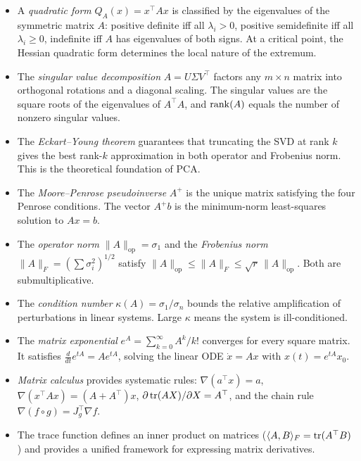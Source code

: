 \documentclass[11pt,a4paper]{article}
\begin{document}
\begin{itemize}
  \item A \emph{quadratic form} $Q_A(x) = x^\top Ax$ is classified
        by the eigenvalues of the symmetric matrix $A$: positive definite
        iff all $\lambda_i > 0$, positive semidefinite iff all
        $\lambda_i \geq 0$, indefinite iff $A$ has eigenvalues of
        both signs.  At a critical point, the Hessian quadratic form
        determines the local nature of the extremum.

  \item The \emph{singular value decomposition} $A = U\Sigma V^\top$
        factors any $m \times n$ matrix into orthogonal rotations and
        a diagonal scaling.  The singular values are the square roots
        of the eigenvalues of $A^\top A$, and $\operatorname{rank}(A)$ equals the
        number of nonzero singular values.

  \item The \emph{Eckart--Young theorem} guarantees that truncating the
        SVD at rank $k$ gives the best rank-$k$ approximation in both
        operator and Frobenius norm.  This is the theoretical
        foundation of PCA.

  \item The \emph{Moore--Penrose pseudoinverse} $A^+$ is the unique
        matrix satisfying the four Penrose conditions.  The vector
        $A^+ b$ is the minimum-norm least-squares solution to $Ax = b$.

  \item The \emph{operator norm} $\|A\|_{\mathrm{op}} = \sigma_1$ and
        the \emph{Frobenius norm} $\|A\|_F = (\sum \sigma_i^2)^{1/2}$
        satisfy $\|A\|_{\mathrm{op}} \leq \|A\|_F \leq \sqrt{r}\,\|A\|_{\mathrm{op}}$.
        Both are submultiplicative.

  \item The \emph{condition number} $\kappa(A) = \sigma_1/\sigma_n$
        bounds the relative amplification of perturbations in linear
        systems.  Large $\kappa$ means the system is ill-conditioned.

  \item The \emph{matrix exponential} $e^A = \sum_{k=0}^\infty A^k/k!$
        converges for every square matrix.  It satisfies
        $\frac{d}{dt}e^{tA} = Ae^{tA}$, solving the linear ODE
        $\dot{x} = Ax$ with $x(t) = e^{tA}x_0$.

  \item \emph{Matrix calculus} provides systematic rules:
        $\nabla(a^\top x) = a$,
        $\nabla(x^\top Ax) = (A + A^\top)x$,
        $\partial\operatorname{tr}(AX)/\partial X = A^\top$,
        and the chain rule $\nabla(f \circ g) = J_g^\top \nabla f$.

  \item The trace function defines an inner product on matrices
        ($\langle A, B \rangle_F = \operatorname{tr}(A^\top B)$) and provides a
        unified framework for expressing matrix derivatives.
\end{itemize}
\end{document}
